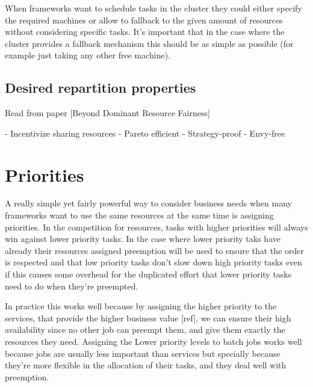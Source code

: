 \documentclass{svjour3}                     %
\begin{document}
When frameworks want to schedule tasks in the cluster they could either specify the required
machines or allow to fallback to the given amount of resources without considering specific
tasks. It's important that in the case where the cluster provides a fallback mechanism 
this should be as simple as possible (for example just taking any other free machine).




\subsection{Desired repartition properties}

Read from  paper [Beyond Dominant Resource Fairness]

- Incentivize sharing resources
- Pareto efficient
- Strategy-proof
- Envy-free


\section{Priorities}

A really simple yet fairly powerful way to consider business needs when many frameworks
want to use the same resources at the same time is assigning priorities. In the competition
for resources, tasks with higher priorities will always win against lower priority tasks. In
the case where lower priority taks have already their resources assigned preemption will be
used to ensure that the order is respected and that low priority tasks don't slow down high
priority tasks even if this causes some overhead for the duplicated effort that lower priority
tasks need to do when they're preempted.

In practice this works well because by assigning the higher priority to the services, 
that provide the higher business value [ref], we can ensure their high availability since 
no other job can preempt them, and give them exactly the resources they need. Assigning the 
Lower priority levels to batch jobs works well because jobs are usually less important
than services but specially because they're more flexible in the allocation of their tasks,
and they deal well with preemption.




\end{document}
